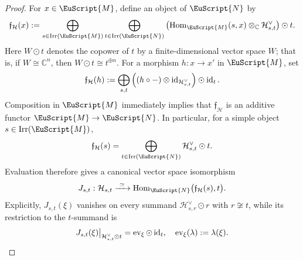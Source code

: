 \documentclass[a4paper,11pt]{article}
\theoremstyle{definition}
\theoremstyle{remark}
\newcommand\eM          {\EuScript{M}}
\newcommand\eN         {\EuScript{N}}
\newcommand{\id}{\operatorname{id}}
\newcommand{\Irr}{\operatorname{Irr}}
\newcommand{\Hom}{\operatorname{Hom}}
\begin{document}
\begin{proof}
For $x\in\eM$, define an object of $\eN$ by
\begin{equation}
    \notag
    \mathfrak{f}_{\mathcal H}(x)
    :=
    \bigoplus_{s\in\Irr(\eM)}
    \bigoplus_{t\in\Irr(\eN)}
    \left(
        \Hom_{\eM}(s,x)
        \otimes_{\mathbb C}
        \mathcal H_{s,t}^{\vee}
    \right)
    \odot t.
\end{equation}
Here $W\odot t$ denotes the copower of $t$ by a finite-dimensional vector space $W$; that is, if $W\cong\mathbb C^n$, then $W\odot t\cong t^{\oplus n}$. For a morphism $h:x\to x'$ in $\eM$, set
\begin{equation}
    \notag
    \mathfrak{f}_{\mathcal H}(h) := \bigoplus_{s,t}\left((h\circ-)\otimes\id_{\mathcal H_{s,t}^{\vee}}\right)
    \odot\id_t.
\end{equation}
Composition in $\eM$ immediately implies that $\mathfrak{f}_{\mathcal H}$ is an additive functor $\eM\to\eN$.  In particular, for a simple object $s\in\Irr(\eM)$,
\begin{equation}
    \notag
    \mathfrak{f}_{\mathcal H}(s)
    =
    \bigoplus_{t\in\Irr(\eN)}
    \mathcal H_{s,t}^{\vee}\odot t.
\end{equation}
Evaluation therefore gives a canonical vector space isomorphism
\begin{equation}
    J_{s,t}:
    \mathcal H_{s,t}
    \xrightarrow{\ \simeq\ }
    \Hom_{\eN}\bigl(\mathfrak{f}_{\mathcal H}(s),t\bigr).
    \label{eq:J-sector-isomorphism}
\end{equation}
Explicitly, $J_{s,t}(\xi)$ vanishes on every summand
$\mathcal H_{s,r}^{\vee}\odot r$ with $r\not\cong t$, while its
restriction to the $t$-summand is
\begin{equation*}
    \notag
    J_{s,t}(\xi)\big|_{\mathcal H_{s,t}^{\vee}\odot t}
    =
    \operatorname{ev}_{\xi}\odot\id_t,
    \quad
    \operatorname{ev}_{\xi}(\lambda):=\lambda(\xi).
\end{equation*}


\end{proof}
\end{document}

